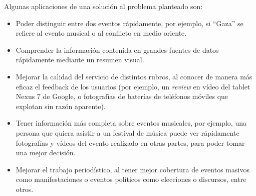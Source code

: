   Algunas aplicaciones de una solución al problema planteado son:

\begin{itemize}
\item Poder distinguir entre dos eventos rápidamente, por ejemplo, si
    ``Gaza'' se refiere al evento musical o al conflicto en medio
    oriente.
\item Comprender la información contenida en grandes fuentes de datos
    rápidamente mediante un resumen visual.
\item Mejorar la calidad del servicio de distintos rubros, al conocer de
    manera más eficaz el feedback de los usuarios (por ejemplo, un
    \emph{review} en vídeo del tablet Nexus 7 de Google, o fotografías de
    baterías de teléfonos móviles que explotan sin razón aparente).
\item Tener información más completa sobre eventos musicales, por
    ejemplo, una persona que quiera asistir a un festival de música
    puede ver rápidamente fotografías y vídeos del evento realizado en
    otras partes, para poder tomar una mejor decisión.
\item Mejorar el trabajo periodístico, al tener mejor cobertura de
    eventos masivos como manifestaciones o eventos políticos como
    elecciones o discursos, entre otros.
\end{itemize}